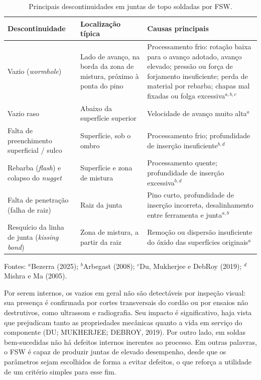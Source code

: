 \documentclass[12pt,openany]{report}
\begin{document}
\begin{table}[htbp]
\centering
\caption{Principais descontinuidades em juntas de topo soldadas por FSW.}
\label{tab:defeitos}
\small
\begin{tabularx}{\textwidth}{L{3.3cm} L{3.3cm} Y}
\toprule
\textbf{Descontinuidade} & \textbf{Localização típica} & \textbf{Causas principais} \\ \midrule
Vazio (\textit{wormhole}) & Lado de avanço, na borda da zona de mistura, próximo à ponta do pino & Processamento frio: rotação baixa para o avanço adotado, avanço elevado; pressão ou força de forjamento insuficiente; perda de material por rebarba; chapas mal fixadas ou folga excessiva$^{a,b,c}$ \\
Vazio raso & Abaixo da superfície superior & Velocidade de avanço muito alta$^{a}$ \\
Falta de preenchimento superficial / sulco & Superfície, sob o ombro & Processamento frio; profundidade de inserção insuficiente$^{b,d}$ \\
Rebarba (\textit{flash}) e colapso do \textit{nugget} & Superfície e zona de mistura & Processamento quente; profundidade de inserção excessiva$^{b,d}$ \\
Falta de penetração (falha de raiz) & Raiz da junta & Pino curto, profundidade de inserção incorreta, desalinhamento entre ferramenta e junta$^{a,b}$ \\
Resquício da linha de junta (\textit{kissing bond}) & Zona de mistura, a partir da raiz & Remoção ou dispersão insuficiente do óxido das superfícies originais$^{a}$ \\ \bottomrule
\end{tabularx}

\vspace{0.1cm}
\raggedright\footnotesize Fontes: $^{a}$Bezerra (2025); $^{b}$Arbegast (2008); $^{c}$Du, Mukherjee e DebRoy (2019); $^{d}$Mishra e Ma (2005).
\end{table}

Por serem internos, os vazios em geral não são detectáveis por inspeção visual: sua presença é confirmada por cortes transversais do cordão ou por ensaios não destrutivos, como ultrassom e radiografia. Seu impacto é significativo, haja vista que prejudicam tanto as propriedades mecânicas quanto a vida em serviço do componente (DU; MUKHERJEE; DEBROY, 2019). Por outro lado, em soldas bem-sucedidas não há defeitos internos inerentes ao processo. Em outras palavras, o FSW é capaz de produzir juntas de elevado desempenho, desde que os parâmetros sejam escolhidos de forma a evitar defeitos, o que reforça a utilidade de um critério simples para esse fim.
\end{document}
